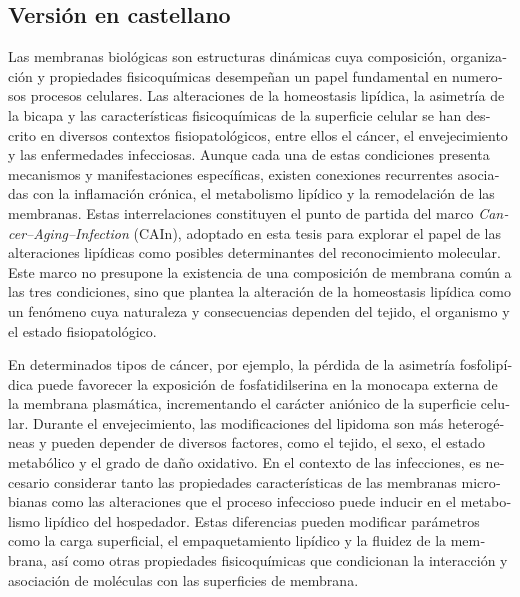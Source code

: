\begin{otherlanguage}{spanish}
\subsection*{Versión en castellano}
{}

Las membranas biológicas son estructuras dinámicas cuya composición, organización y propiedades fisicoquímicas desempeñan un papel fundamental en numerosos procesos celulares. Las alteraciones de la homeostasis lipídica, la asimetría de la bicapa y las características fisicoquímicas de la superficie celular se han descrito en diversos contextos fisiopatológicos, entre ellos el cáncer, el envejecimiento y las enfermedades infecciosas. Aunque cada una de estas condiciones presenta mecanismos y manifestaciones específicas, existen conexiones recurrentes asociadas con la inflamación crónica, el metabolismo lipídico y la remodelación de las membranas. Estas interrelaciones constituyen el punto de partida del marco \textit{Cancer--Aging--Infection} (CAIn), adoptado en esta tesis para explorar el papel de las alteraciones lipídicas como posibles determinantes del reconocimiento molecular. Este marco no presupone la existencia de una composición de membrana común a las tres condiciones, sino que plantea la alteración de la homeostasis lipídica como un fenómeno cuya naturaleza y consecuencias dependen del tejido, el organismo y el estado fisiopatológico.

En determinados tipos de cáncer, por ejemplo, la pérdida de la asimetría fosfolipídica puede favorecer la exposición de fosfatidilserina en la monocapa externa de la membrana plasmática, incrementando el carácter aniónico de la superficie celular. Durante el envejecimiento, las modificaciones del lipidoma son más heterogéneas y pueden depender de diversos factores, como el tejido, el sexo, el estado metabólico y el grado de daño oxidativo. En el contexto de las infecciones, es necesario considerar tanto las propiedades características de las membranas microbianas como las alteraciones que el proceso infeccioso puede inducir en el metabolismo lipídico del hospedador. Estas diferencias pueden modificar parámetros como la carga superficial, el empaquetamiento lipídico y la fluidez de la membrana, así como otras propiedades fisicoquímicas que condicionan la interacción y asociación de moléculas con las superficies de membrana.



\end{otherlanguage}
